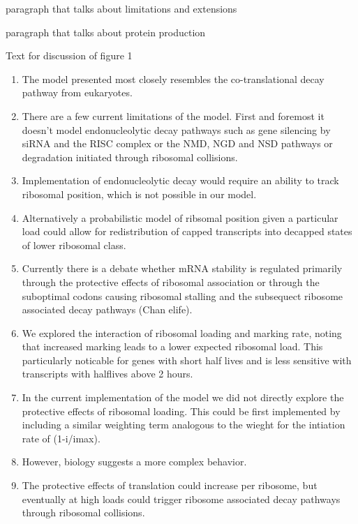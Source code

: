 \documentclass[review]{elsarticle}
\begin{document}
paragraph that talks about limitations and extensions

paragraph that talks about protein production


Text for discussion of figure 1
\begin{enumerate}
	\item The model presented most closely resembles the co-translational decay pathway from eukaryotes.
	\item There are a few current limitations of the model. First and foremost it doesn't model endonucleolytic decay pathways such as gene silencing by siRNA and the RISC complex or the NMD, NGD and NSD pathways or degradation initiated through ribosomal collisions.
	\item Implementation of endonucleolytic decay would require an ability to track ribosomal position, which is not possible in our model. 
	\item Alternatively a probabilistic model of ribsomal position given a particular load could allow for redistribution of capped transcripts into decapped states of lower ribosomal class.
	
	\item Currently there is a debate whether mRNA stability is regulated primarily through the protective effects of ribosomal association or through the suboptimal codons causing ribosomal stalling and the subsequect ribosome associated decay pathways  (Chan elife).
	\item We explored the interaction of ribosomal loading and marking rate, noting that increased marking leads to a lower expected ribosomal load. This particularly noticable for genes with short half lives and is less sensitive with transcripts with halflives above 2 hours.
	\item In the current implementation of the model we did not directly explore the protective effects of ribosomal loading. This could be first implemented by including a similar weighting term analogous to the wieght for the intiation rate of (1-i/imax).
	\item However, biology suggests a more complex behavior.
	\item The protective effects of translation could increase per ribosome, but eventually at high loads  could trigger ribosome associated decay pathways through ribosomal collisions.


\end{enumerate}
\end{document}
